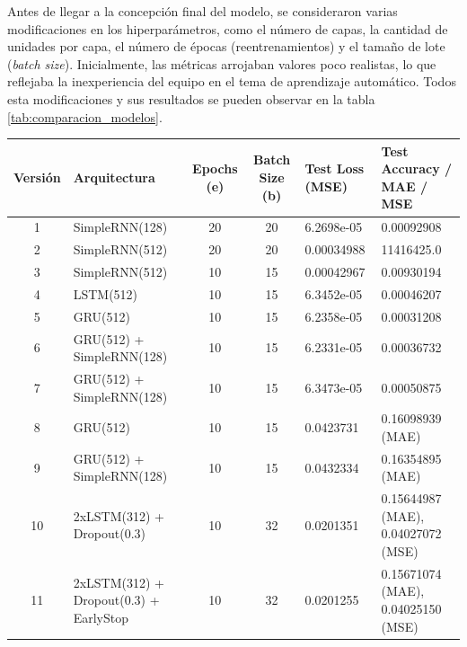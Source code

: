 \documentclass[runningheads]{llncs}
\begin{document}
Antes de llegar a la concepción final del modelo, se consideraron varias modificaciones en los hiperparámetros, como el número de capas, la cantidad de unidades por capa, el número de épocas (reentrenamientos) y el tamaño de lote (\textit{batch size}). Inicialmente, las métricas arrojaban valores poco realistas, lo que reflejaba la inexperiencia del equipo en el tema de aprendizaje automático. Todos esta modificaciones y sus resultados se pueden observar en la tabla \ref{tab:comparacion_modelos}.


\begin{table}[h!]
	\centering
	\begin{tabular}{|c|p{2.5cm}|c|c|p{1.8cm}|p{2.8cm}|}
		\hline
		\textbf{Versión} & \textbf{Arquitectura} & \textbf{Epochs (e)} & \textbf{Batch Size (b)} & \textbf{Test Loss \newline (MSE)} & \textbf{Test Accuracy / \newline MAE / MSE} \\ \hline
		1 & SimpleRNN(128) & 20 & 20 & 6.2698e-05 & 0.00092908 \\ \hline
		2 & SimpleRNN(512) & 20 & 20 & 0.00034988 & 11416425.0 \\ \hline
		3 & SimpleRNN(512) & 10 & 15 & 0.00042967 & 0.00930194 \\ \hline
		4 & LSTM(512) & 10 & 15 & 6.3452e-05 & 0.00046207 \\ \hline
		5 & GRU(512) & 10 & 15 & 6.2358e-05 & 0.00031208 \\ \hline
		6 & GRU(512) + \newline SimpleRNN(128) & 10 & 15 & 6.2331e-05 & 0.00036732 \\ \hline
		7 & GRU(512) + \newline SimpleRNN(128) & 10 & 15 & 6.3473e-05 & 0.00050875 \\ \hline
		8 & GRU(512) & 10 & 15 & 0.0423731 & 0.16098939 (MAE) \\ \hline
		9 & GRU(512) + \newline SimpleRNN(128) & 10 & 15 & 0.0432334 & 0.16354895 (MAE) \\ \hline
		10 & 2xLSTM(312) + \newline Dropout(0.3) & 10 & 32 & 0.0201351 & 0.15644987 (MAE), 0.04027072 (MSE) \\ \hline
		11 & 2xLSTM(312) + \newline Dropout(0.3) + \newline EarlyStop & 10 & 32 & 0.0201255 & 0.15671074 (MAE), 0.04025150 (MSE) \\ \hline

\end{tabular}
\end{table}
\end{document}
